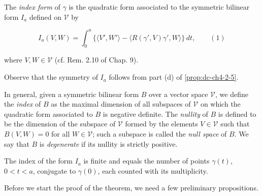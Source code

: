 \begin{definition}
  \label{def:dc-ch11-2-1}
  The \emph{index form} of $\gamma$ is the quadratic form associated to the symmetric
  bilinear form $I_a$ defined on $\mathcal{V}$ by
  
  $$
  I_a(V,W)=\int_0^a\{\langle V',W'\rangle-\langle R(\gamma',V)\gamma',W\rangle\}\,dt,\qquad(1)
  $$
  
  where $V,W\in\mathcal{V}$ (cf. Rem. 2.10 of Chap. 9).
  
  Observe that the symmetry of $I_a$ follows from part (d) of \cref{prop:dc-ch4-2-5}.
  
  In general, given a symmetric bilinear form $B$ over a vector space
  $\mathcal{V}$, we define the \emph{index} of $B$ as the maximal dimension of all
  subspaces of $\mathcal{V}$ on which the quadratic form associated to $B$ is
  negative definite. The \emph{nullity} of $B$ is defined to be the dimension of the
  subspace of $\mathcal{V}$ formed by the elements $V\in\mathcal{V}$ such that
  $B(V,W)=0$ for all $W\in\mathcal{V}$; such a subspace is called the \emph{null space}
  of $B$. We say that $B$ is \emph{degenerate} if its nullity is strictly positive.
\end{definition}

\begin{theorem}
  \label{thm:dc-ch11-2-2}
  The index of the form $I_a$ is finite and equals the number of points
  $\gamma(t)$, $0<t<a$, conjugate to $\gamma(0)$, each counted with its
  multiplicity.
  
  Before we start the proof of the theorem, we need a few preliminary
  propositions.
\end{theorem}


